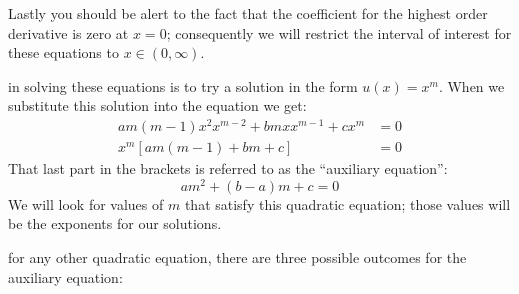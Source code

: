 Lastly you should be alert to the fact that the coefficient for the highest order derivative is zero at $x=0$; consequently we will restrict the interval of interest for these equations to $x \in \left(0,\infty\right)$.

\vspace{4.0cm}

 in solving these equations is to try a solution in the form $u(x)=x^m$.  When we substitute this solution into the equation we get:
\begin{align*}
am(m-1)x^2x^{m-2}+bmxx^{m-1}+cx^m &=0 \\
x^m\left[am(m-1)+bm+c \right]&=0
\end{align*}
That last part in the brackets is referred to as the ``auxiliary equation'':
\begin{equation}
am^2+(b-a)m+c=0
\label{eq:CE-aux}
\end{equation}
We will look for values of $m$ that satisfy this quadratic equation; those values will be the exponents for our solutions.

 for any other quadratic equation, there are three possible outcomes for the auxiliary equation: 

